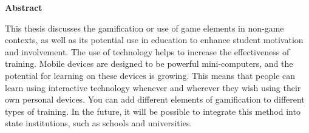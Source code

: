 \newpage
\pagestyle{plain}

\begin{center}
    \Large
    \textbf{Abstract}
\end{center}
This thesis discusses the gamification or use of game elements in non-game contexts, as well as its potential use in education to enhance student motivation and involvement. The use of technology helps to increase the effectiveness of training. Mobile devices are designed to be powerful mini-computers, and the potential for learning on these devices is growing. This means that people can learn using interactive technology whenever and wherever they wish using their own personal devices. You can add different elements of gamification to different types of training. In the future, it will be possible to integrate this method into state institutions, such as schools and universities.
